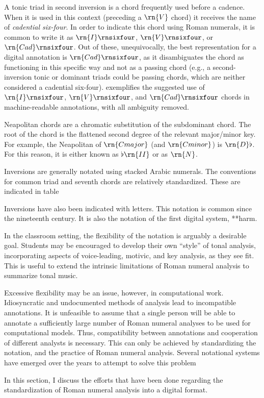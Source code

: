 A tonic triad in second inversion is a chord frequently used
before a cadence. When it is used in this context (preceding
a $\rn{V}$ chord) it receives the name of \emph{cadential
six-four}. In order to indicate this chord using Roman
numerals, it is common to write it as $\rn{I}\rnsixfour$,
$\rn{V}\rnsixfour$, or $\rn{Cad}\rnsixfour$. Out of these,
unequivocally, the best representation for a digital
annotation is $\rn{Cad}\rnsixfour$, as it disambiguates the
chord as functioning in this specific way and not as a
passing chord (e.g., a second-inversion tonic or dominant
triads could be passing chords, which are neither considered
a cadential six-four). 
exemplifies the suggested use of $\rn{I}\rnsixfour$,
$\rn{V}\rnsixfour$, and $\rn{Cad}\rnsixfour$ chords in
machine-readable annotations, with all ambiguity removed.

Neapolitan chords are a chromatic substitution of the
subdominant chord. The root of the chord is the flattened
second degree of the relevant major/minor key. For example,
the Neapolitan of $\rn{C major}$ (and $\rn{C minor}$) is
$\rn{D}\flat$. For this reason, it is either known as
$\flat\rn{II}$ or as $\rn{N}$.

Inversions are generally notated using stacked Arabic
numerals. The conventions for common triad and seventh
chords are relatively standardized. These are indicated in
table 



Inversions have also been indicated with letters. This
notation is common since the nineteenth century. It is also
the notation of the first digital system, **harm.

In the classroom setting, the flexibility of the notation is
arguably a desirable goal. Students may be encouraged to
develop their own ``style'' of tonal analysis, incorporating
aspects of voice-leading, motivic, and key analysis, as they
see fit. This is useful to extend the intrinsic limitations
of Roman numeral analysis to summarize tonal music.

Excessive flexibility may be an issue, however, in
computational work. Idiosyncratic and undocumented methods
of analysis lead to incompatible annotations. It is
unfeasible to assume that a single person will be able to
annotate a sufficiently large number of Roman numeral
analyses to be used for computational models. Thus,
compatibility between annotations and cooperation of
different analysts is necessary. This can only be achieved
by standardizing the notation, and the practice of Roman
numeral analysis. Several notational systems have emerged
over the years to attempt to solve this problem

In this section, I discuss the efforts that have been done
regarding the standardization of Roman numeral analysis into
a digital format.